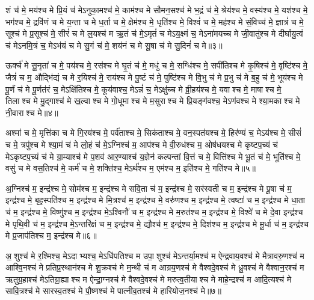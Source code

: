 शं च॑ मे॒ मय॑श्च मे प्रि॒यं च॑ मेऽनुका॒मश्च॑ मे॒ काम॑श्च मे सौमन॒सश्च॑ मे भ॒द्रं च॑ मे॒ श्रेय॑श्च मे॒ वस्य॑श्च मे॒ यश॑श्च मे॒ भग॑श्च मे॒ द्रवि॑णं च मे य॒न्ता च मे ध॒र्ता च मे॒ क्षेम॑श्च मे॒ धृति॑श्च मे॒ विश्वं॑ च मे॒ मह॑श्च मे सं॒विच्च॑ मे॒ ज्ञात्रं॑ च मे॒ सूश्च॑ मे प्र॒सूश्च॑ मे॒ सीरं॑ च मे ल॒यश्च॑ म ऋ॒तं च॑ मे॒ऽमृतं॑ च मेऽय॒क्ष्मं च॒ मेऽना॑मयच्च मे जी॒वातु॑श्च मे दीर्घायु॒त्वं च॑ मेऽनमि॒त्रं च॒ मेऽभ॑यं च मे सु॒गं च॑ मे॒ शय॑नं च मे सू॒षा च॑ मे सु॒दिनं॑ च मे॥३॥ 

ऊर्क्च॑ मे सू॒नृता॑ च मे॒ पय॑श्च मे॒ रस॑श्च मे घृ॒तं च॑ मे॒ मधु॑ च मे॒ सग्धि॑श्च मे॒ सपी॑तिश्च मे कृ॒षिश्च॑ मे॒ वृष्टि॑श्च मे॒ जैत्रं॑ च म॒ औद्भि॑द्यं च मे र॒यिश्च॑ मे॒ राय॑श्च मे पु॒ष्टं च॑ मे॒ पुष्टि॑श्च मे वि॒भु च॑ मे प्र॒भु च॑ मे ब॒हु च॑ मे॒ भूय॑श्च मे पू॒र्णं च॑ मे पू॒र्णत॑रं च॒ मेऽक्षि॑तिश्च मे॒ कूय॑वाश्च॒ मेऽन्नं॑ च॒ मेऽक्षु॑च्च मे व्री॒हय॑श्च मे॒ यवाश्च मे॒ माषाश्च मे॒ तिलाश्च मे मु॒द्गाश्च॑ मे ख॒ल्वाश्च मे गो॒धूमाश्च मे म॒सुराश्च मे प्रि॒यङ्ग॑वश्च॒ मेऽण॑वश्च मे श्या॒मकाश्च मे नी॒वाराश्च मे॥४॥ 

अश्मा॑ च मे॒ मृत्ति॑का च मे गि॒रय॑श्च मे॒ पर्व॑ताश्च मे॒ सिक॑ताश्च मे॒ वन॒स्पत॑यश्च मे॒ हिर॑ण्यं च॒ मेऽय॑श्च मे॒ सीसं॑ च मे॒ त्रपु॑श्च मे श्या॒मं च॑ मे लो॒हं च॑ मे॒ऽग्निश्च॑ म॒ आप॑श्च मे वी॒रुध॑श्च म॒ ओष॑धयश्च मे कृष्टप॒च्यं च॑ मेऽकृष्टप॒च्यं च॑ मे ग्रा॒म्याश्च॑ मे प॒शव॑ आर॒ण्याश्च॑ य॒ज्ञेन॑ कल्पन्तां वि॒त्तं च मे॒ वित्ति॑श्च मे भू॒तं च॑ मे॒ भूति॑श्च मे॒ वसु॑ च मे वस॒तिश्च॑ मे॒ कर्म॑ च मे॒ शक्ति॑श्च॒ मेऽर्थ॑श्च म॒ एम॑श्च म॒ इति॑श्च मे॒ गति॑श्च मे॥५॥ 

अ॒ग्निश्च॑ म॒ इन्द्र॑श्च मे॒ सोम॑श्च म॒ इन्द्र॑श्च मे सवि॒ता च॑ म॒ इन्द्र॑श्च मे॒ सर॑स्वती च म॒ इन्द्र॑श्च मे पू॒षा च॑ म॒ इन्द्र॑श्च मे॒ बृह॒स्पति॑श्च म॒ इन्द्र॑श्च मे मि॒त्रश्च॑ म॒ इन्द्र॑श्च मे॒ वरु॑णश्च म॒ इन्द्र॑श्च मे॒ त्वष्टा॑ च म॒ इन्द्र॑श्च मे धा॒ता च॑ म॒ इन्द्र॑श्च मे॒ विष्णु॑श्च म॒ इन्द्र॑श्च मे॒ऽश्विनौ॑ च म॒ इन्द्र॑श्च मे म॒रुत॑श्च म॒ इन्द्र॑श्च मे॒ विश्वे॑ च मे दे॒वा इन्द्र॑श्च मे पृथि॒वी च॑ म॒ इन्द्र॑श्च मे॒ऽन्तरि॑क्षं च म॒ इन्द्र॑श्च मे॒ द्यौश्च॑ म॒ इन्द्र॑श्च मे॒ दिश॑श्च म॒ इन्द्र॑श्च मे मू॒र्धा च॑ म॒ इन्द्र॑श्च मे प्र॒जाप॑तिश्च म॒ इन्द्र॑श्च मे॥६॥ 

अ॒शुश्च॑ मे र॒श्मिश्च॒ मेऽदाभ्यश्च॒ मेऽधि॑पतिश्च म उपा॒शुश्च॑ मेऽन्तर्या॒मश्च॑ म ऐन्द्रवाय॒वश्च॑ मे मैत्रावरु॒णश्च॑ म आश्वि॒नश्च॑ मे प्रतिप्र॒स्थान॑श्च मे शु॒क्रश्च॑ मे म॒न्थी च॑ म आग्रय॒णश्च॑ मे वैश्वदे॒वश्च॑ मे ध्रु॒वश्च॑ मे वैश्वान॒रश्च॑ म ऋतुग्र॒हाश्च॑ मेऽतिग्रा॒ह्याश्च म ऐन्द्रा॒ग्नश्च॑ मे वैश्वदे॒वश्च॑ मे मरुत्व॒तीयाश्च मे माहे॒न्द्रश्च॑ म आदि॒त्यश्च॑ मे सावि॒त्रश्च॑ मे सारस्व॒तश्च॑ मे पौ॒ष्णश्च॑ मे पात्नीव॒तश्च॑ मे हारियोज॒नश्च॑ मे॥७॥ 

